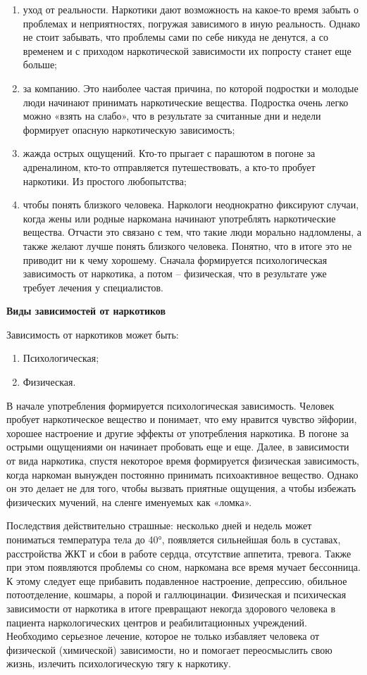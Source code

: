 \begin{enumerate}
    \item уход от реальности. Наркотики дают возможность на какое-то время забыть о проблемах и неприятностях, погружая зависимого в иную реальность. Однако не стоит забывать, что проблемы сами по себе никуда не денутся, а со временем и с приходом наркотической зависимости их попросту станет еще больше;
    \item за компанию. Это наиболее частая причина, по которой подростки и молодые люди начинают принимать наркотические вещества. Подростка очень легко можно «взять на слабо», что в результате за считанные дни и недели формирует опасную наркотическую зависимость;
    \item жажда острых ощущений. Кто-то прыгает с парашютом в погоне за адреналином, кто-то отправляется путешествовать, а кто-то пробует наркотики. Из простого любопытства;
    \item чтобы понять близкого человека. Наркологи неоднократно фиксируют случаи, когда жены или родные наркомана начинают употреблять наркотические вещества. Отчасти это связано с тем, что такие люди морально надломлены, а также желают лучше понять близкого человека. Понятно, что в итоге это не приводит ни к чему хорошему. Сначала формируется психологическая зависимость от наркотика, а потом – физическая, что в результате уже требует лечения у специалистов.
\end{enumerate}

\textbf{Виды зависимостей от наркотиков}

Зависимость от наркотиков может быть:
\begin{enumerate}
    \item Психологическая;
    \item Физическая.
\end{enumerate}

В начале употребления формируется психологическая зависимость. Человек пробует наркотическое вещество и понимает, что ему нравится чувство эйфории, хорошее настроение и другие эффекты от употребления наркотика. В погоне за острыми ощущениями он начинает пробовать еще и еще. Далее, в зависимости от вида наркотика, спустя некоторое время формируется физическая зависимость, когда наркоман вынужден постоянно принимать психоактивное вещество. Однако он это делает не для того, чтобы вызвать приятные ощущения, а чтобы избежать физических мучений, на сленге именуемых как «ломка».

Последствия действительно страшные: несколько дней и недель может пониматься температура тела до 40°, появляется сильнейшая боль в суставах, расстройства ЖКТ и сбои в работе сердца, отсутствие аппетита, тревога. Также при этом появляются проблемы со сном, наркомана все время мучает бессонница. К этому следует еще прибавить подавленное настроение, депрессию, обильное потоотделение, кошмары, а порой и галлюцинации. Физическая и психическая зависимости от наркотика в итоге превращают некогда здорового человека в пациента наркологических центров и реабилитационных учреждений. Необходимо серьезное лечение, которое не только избавляет человека от физической (химической) зависимости, но и помогает переосмыслить свою жизнь, излечить психологическую тягу к наркотику.


